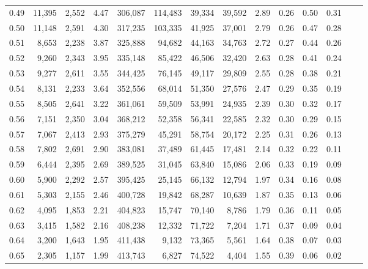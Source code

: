 \begin{tabular}{rrrrrrrrrrrrrr}
0.49 &  11,395 &  2,552 &    4.47 &  306,087 &  114,483 &  39,334 &  39,592 &  2.89 &  0.26 &  0.50 &      0.31 \\
0.50 &  11,148 &  2,591 &    4.30 &  317,235 &  103,335 &  41,925 &  37,001 &  2.79 &  0.26 &  0.47 &      0.28 \\
0.51 &   8,653 &  2,238 &    3.87 &  325,888 &   94,682 &  44,163 &  34,763 &  2.72 &  0.27 &  0.44 &      0.26 \\
0.52 &   9,260 &  2,343 &    3.95 &  335,148 &   85,422 &  46,506 &  32,420 &  2.63 &  0.28 &  0.41 &      0.24 \\
0.53 &   9,277 &  2,611 &    3.55 &  344,425 &   76,145 &  49,117 &  29,809 &  2.55 &  0.28 &  0.38 &      0.21 \\
0.54 &   8,131 &  2,233 &    3.64 &  352,556 &   68,014 &  51,350 &  27,576 &  2.47 &  0.29 &  0.35 &      0.19 \\
0.55 &   8,505 &  2,641 &    3.22 &  361,061 &   59,509 &  53,991 &  24,935 &  2.39 &  0.30 &  0.32 &      0.17 \\
0.56 &   7,151 &  2,350 &    3.04 &  368,212 &   52,358 &  56,341 &  22,585 &  2.32 &  0.30 &  0.29 &      0.15 \\
0.57 &   7,067 &  2,413 &    2.93 &  375,279 &   45,291 &  58,754 &  20,172 &  2.25 &  0.31 &  0.26 &      0.13 \\
0.58 &   7,802 &  2,691 &    2.90 &  383,081 &   37,489 &  61,445 &  17,481 &  2.14 &  0.32 &  0.22 &      0.11 \\
0.59 &   6,444 &  2,395 &    2.69 &  389,525 &   31,045 &  63,840 &  15,086 &  2.06 &  0.33 &  0.19 &      0.09 \\
0.60 &   5,900 &  2,292 &    2.57 &  395,425 &   25,145 &  66,132 &  12,794 &  1.97 &  0.34 &  0.16 &      0.08 \\
0.61 &   5,303 &  2,155 &    2.46 &  400,728 &   19,842 &  68,287 &  10,639 &  1.87 &  0.35 &  0.13 &      0.06 \\
0.62 &   4,095 &  1,853 &    2.21 &  404,823 &   15,747 &  70,140 &   8,786 &  1.79 &  0.36 &  0.11 &      0.05 \\
0.63 &   3,415 &  1,582 &    2.16 &  408,238 &   12,332 &  71,722 &   7,204 &  1.71 &  0.37 &  0.09 &      0.04 \\
0.64 &   3,200 &  1,643 &    1.95 &  411,438 &    9,132 &  73,365 &   5,561 &  1.64 &  0.38 &  0.07 &      0.03 \\
0.65 &   2,305 &  1,157 &    1.99 &  413,743 &    6,827 &  74,522 &   4,404 &  1.55 &  0.39 &  0.06 &      0.02 \\

\end{tabular}
